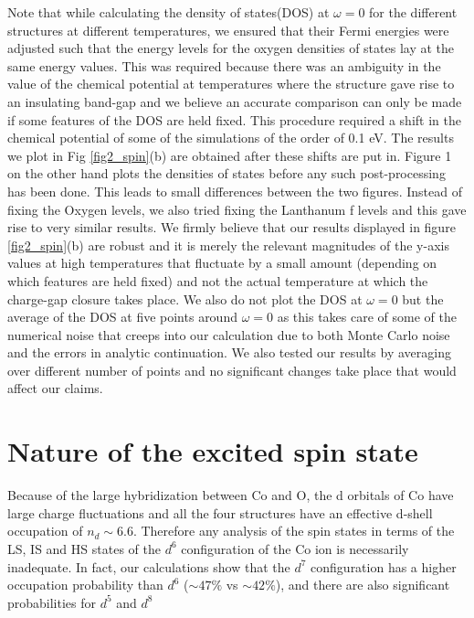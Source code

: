 \documentclass[10pt]{ruthesis}
\begin{document}
{Note that while calculating the density of states(DOS) at $\omega=0$ for the different structures at different temperatures, we ensured that their Fermi energies were adjusted such that the energy levels for the oxygen densities of states lay at the same energy values. This was required because there was an ambiguity in the value of the chemical potential at temperatures where the structure gave rise to an insulating band-gap and we believe an accurate comparison can only be made if some features of the DOS are held fixed. This procedure required a shift in the chemical potential of some of the simulations of the order of 0.1 eV. The results we plot in Fig \ref{fig2_spin}(b) are obtained after these shifts are put in. Figure 1 on the other hand plots the densities of states before any such post-processing has been done. This leads to small differences between the two figures.  Instead of fixing the Oxygen levels, we also tried fixing the Lanthanum f levels and this gave rise to very similar results. We firmly believe that  our results displayed in figure \ref{fig2_spin}(b) are robust and it is merely the relevant magnitudes of the y-axis values at high temperatures that fluctuate by a small amount (depending on which features are held fixed) and not the actual temperature at which the charge-gap closure takes place. We also do not plot the DOS at $\omega=0$ but the average of the DOS at five points around $\omega=0$ as this takes care of some of the numerical noise that creeps into our calculation due to both Monte Carlo noise and the errors in analytic continuation. We also tested our results by averaging over different number of points and no significant changes take place that would affect our claims.


\section{Nature of the excited spin state}
 Because of the large hybridization between Co and O, the d orbitals of Co have large charge fluctuations and all the four structures have an effective d-shell occupation of $n_d \sim 6.6$. Therefore any analysis of the spin states in terms of the LS, IS and HS states of the $d^6$ configuration of the Co ion is necessarily inadequate. In fact, our calculations show that the $d^7$ configuration has a higher occupation probability than $d^6$ ($\sim 47\%$ vs $\sim 42\%$), and there are also significant probabilities for $d^5$ and $d^8$

}
\end{document}
